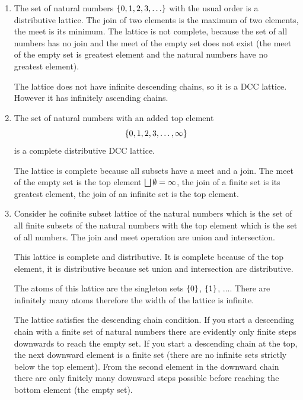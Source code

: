 \begin{enumerate}
    \item The set of natural numbers $\left\{0, 1, 2, 3, \ldots\right\}$ with the usual order
        is a distributive lattice.
        The join of two elements is the maximum of two elements, the meet is its
        minimum. The lattice is not complete, because the set of all numbers has
        no join and the meet of the empty set does not exist (the meet of the
        empty set is greatest element and the natural numbers have no greatest
        element).

        The lattice does not have infinite descending chains, so it is a DCC
        lattice. However it has infinitely ascending chains.


    \item The set of natural numbers with an added top element
        $$\left\{0, 1, 2, 3, \ldots, \infty\right\}$$
        is a complete distributive DCC lattice.

        The lattice is complete because all subsets have a meet and a join. The
        meet of the
        empty set is the top element $\bigsqcup \emptyset = \infty$, the join of
        a finite set is its greatest element, the join of an infinite set is the
        top element.

    \item Consider he cofinite subset lattice of the natural numbers which is
        the set of all finite subsets of the natural numbers with the top
        element which is the set of all numbers. The join and meet operation are
        union and intersection.

        This lattice is complete and distributive. It is complete because of the
        top element, it is distributive because set union and intersection are
        distributive.

        The atoms of this lattice are the singleton sets $\left\{0\right\}$, $\left\{1\right\}$,
        $\ldots$. There are infinitely many atoms therefore the width of the
        lattice is infinite.

        The lattice satisfies the descending chain condition. If you start a
        descending chain with a finite set of natural numbers there are
        evidently only finite steps downwards to reach the empty set. If you
        start a descending chain at the top, the next downward element is a
        finite set (there are no infinite sets strictly below the top element).
        From the second element in the downward chain there are only finitely
        many downward steps possible before reaching the bottom element (the
        empty set).



\end{enumerate}
